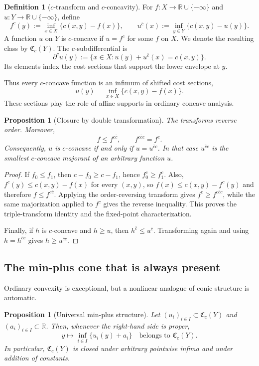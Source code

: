 \documentclass[11pt,a4paper]{article}
\newtheorem{proposition}[theorem]{Proposition}
\theoremstyle{definition}
\newtheorem{definition}[theorem]{Definition}
\theoremstyle{remark}
\newcommand{\R}{\mathbb R}
\newcommand{\Cfrak}{\mathfrak C}
\begin{document}
\begin{definition}[$c$-transform and $c$-concavity]\label{def:c-transform}
For $f:X\to\R\cup\{-\infty\}$ and $u:Y\to\R\cup\{-\infty\}$, define
\[
  f^c(y):=\inf_{x\in X}\{c(x,y)-f(x)\},
  \qquad
  u^{\bar c}(x):=\inf_{y\in Y}\{c(x,y)-u(y)\}.
\]
A function $u$ on $Y$ is $c$-concave if $u=f^c$ for some $f$ on $X$. We denote
the resulting class by $\Cfrak_c(Y)$. The $c$-subdifferential is
\[
  \partial^c u(y)
  :=\{x\in X:u(y)+u^{\bar c}(x)=c(x,y)\}.
\]
Its elements index the cost sections that support the lower envelope at $y$.
\end{definition}

Thus every $c$-concave function is an infimum of shifted cost sections,
\[
  u(y)=\inf_{x\in X}\{c(x,y)-f(x)\}.
\]
These sections play the role of affine supports in ordinary concave analysis.

\begin{proposition}[Closure by double transformation]\label{prop:closure}
The transforms reverse order. Moreover,
\[
  f\leq f^{c\bar c},
  \qquad
  f^{c\bar c c}=f^c.
\]
Consequently, $u$ is $c$-concave if and only if
$u=u^{\bar c c}$. In that case $u^{\bar c c}$ is the smallest $c$-concave
majorant of an arbitrary function $u$.
\end{proposition}

\begin{proof}
If $f_0\leq f_1$, then $c-f_0\geq c-f_1$, hence
$f_0^c\geq f_1^c$. Also, $f^c(y)\leq c(x,y)-f(x)$ for every $(x,y)$, so
$f(x)\leq c(x,y)-f^c(y)$ and therefore $f\leq f^{c\bar c}$. Applying the
order-reversing transform gives $f^c\geq f^{c\bar c c}$, while the same
majorization applied to $f^c$ gives the reverse inequality. This proves the
triple-transform identity and the fixed-point characterization.

Finally, if $h$ is $c$-concave and $h\geq u$, then
$h^{\bar c}\leq u^{\bar c}$. Transforming again and using
$h=h^{\bar c c}$ gives $h\geq u^{\bar c c}$.
\end{proof}

\subsection{The min-plus cone that is always present}

Ordinary convexity is exceptional, but a nonlinear analogue of conic structure
is automatic.

\begin{proposition}[Universal min-plus structure]\label{prop:tropical}
Let $(u_i)_{i\in I}\subset\Cfrak_c(Y)$ and $(a_i)_{i\in I}\subset\R$. Then,
whenever the right-hand side is proper,
\[
  y\longmapsto\inf_{i\in I}\{u_i(y)+a_i\}
  \quad\text{belongs to }\Cfrak_c(Y).
\]
In particular, $\Cfrak_c(Y)$ is closed under arbitrary pointwise infima and
under addition of constants.
\end{proposition}
\end{document}
